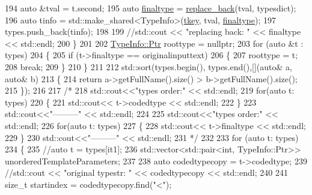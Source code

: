 \begin{DoxyCode}
194         \textcolor{keyword}{auto} &tval = t.second;
195         \textcolor{keyword}{auto} \hyperlink{classsmacc_1_1introspection_1_1TypeInfo_aa4010ed427e12db443e08ab16a3de243}{finaltype} = \hyperlink{namespacesmacc_1_1introspection_a19350163cda321a04645dcd6f6585f24}{replace\_back}(tval, typesdict);
196         \textcolor{keyword}{auto} tinfo = std::make\_shared<TypeInfo>(\hyperlink{classsmacc_1_1introspection_1_1TypeInfo_a697dd505119258dba1224d10eea5b2bd}{tkey}, tval, \hyperlink{classsmacc_1_1introspection_1_1TypeInfo_aa4010ed427e12db443e08ab16a3de243}{finaltype});
197         types.push\_back(tinfo);
198 
199         \textcolor{comment}{//std::cout << "replacing back: " << finaltype << std::endl;}
200     \}
201 
202     \hyperlink{classsmacc_1_1introspection_1_1TypeInfo_aa6ffd9c39811d59f7c771941b7fad860}{TypeInfo::Ptr} roottype = \textcolor{keyword}{nullptr};
203     \textcolor{keywordflow}{for} (\textcolor{keyword}{auto} &t : types)
204     \{
205         \textcolor{keywordflow}{if} (t->finaltype == originalinputtext)
206         \{
207             roottype = t;
208             \textcolor{keywordflow}{break};
209         \}
210     \}
211 
212     std::sort(types.begin(), types.end(),[](\textcolor{keyword}{auto}& a, \textcolor{keyword}{auto}& b)
213     \{
214         \textcolor{keywordflow}{return} a->getFullName().size() > b->getFullName().size();
215     \});
216 
217     \textcolor{comment}{/*}
218 \textcolor{comment}{    std::cout<<"types order:" << std::endl;}
219 \textcolor{comment}{    for(auto t: types)}
220 \textcolor{comment}{    \{}
221 \textcolor{comment}{        std::cout<< t->codedtype << std::endl;}
222 \textcolor{comment}{    \}}
223 \textcolor{comment}{    std::cout<<"---------" << std::endl;}
224 \textcolor{comment}{}
225 \textcolor{comment}{    std::cout<<"types order:" << std::endl;}
226 \textcolor{comment}{    for(auto t: types)}
227 \textcolor{comment}{    \{}
228 \textcolor{comment}{        std::cout<< t->finaltype << std::endl;}
229 \textcolor{comment}{    \}}
230 \textcolor{comment}{    std::cout<<"---------" << std::endl;}
231 \textcolor{comment}{    */}
232 
233     \textcolor{keywordflow}{for} (\textcolor{keyword}{auto} t: types)
234     \{
235         \textcolor{comment}{//auto t = types[it1];}
236         std::vector<std::pair<int, TypeInfo::Ptr>> unorderedTemplateParameters;
237 
238         \textcolor{keyword}{auto} codedtypecopy = t->codedtype;
239         \textcolor{comment}{//std::cout << "original typestr: " << codedtypecopy << std::endl;}
240 
241         \textcolor{keywordtype}{size\_t} startindex = codedtypecopy.find(\textcolor{stringliteral}{"<"});

\end{DoxyCode}

